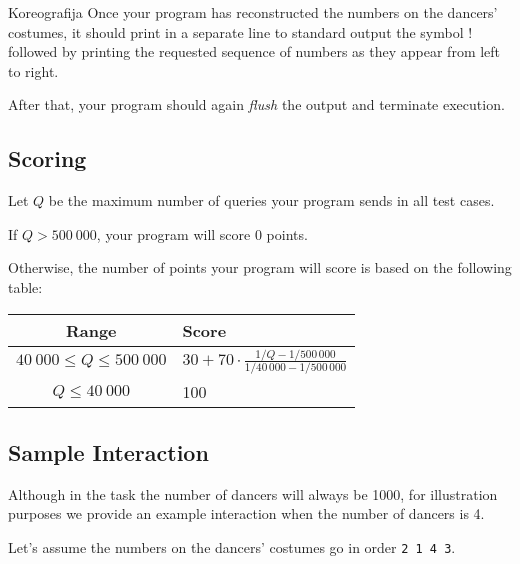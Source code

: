 \begin{statement}[
  problempoints=100,
  timelimit=8 seconds,
  memorylimit=1024 MiB,
]{Koreografija}
Once your program has reconstructed the numbers on the dancers' costumes, it should print in a separate line to standard output
the symbol $\texttt{!}$ followed by 
printing the requested sequence of numbers as they appear from left to right. 

After that,
your program should again \textit{flush} the output and terminate
execution.


\subsection*{Scoring}

Let $Q$ be the maximum number of queries your program sends in all test cases.

If $Q > 500~000$, your program will score 0 points.

Otherwise, the number of points your program will score is based on the following table:

{\renewcommand{\arraystretch}{1.4}
  \setlength{\tabcolsep}{6pt}
  \begin{tabular}{cl}
   Range & Score  \\ \midrule
    $40~000 \leq Q \leq 500~000$ & $30 + 70 \cdot 
    \frac{1/Q - 1/500\,000}{1/40\,000 - 1/500\,000}$ \\
    $Q \leq 40~000$ & 100 \\
\end{tabular}}

\newpage
\subsection*{Sample Interaction}
Although in the task the number of dancers will always be 1000, for illustration purposes we provide an example
interaction when the number of dancers is 4. 

Let's assume the numbers on the dancers' costumes go in order \texttt{2 1 4 3}.


\end{statement}
